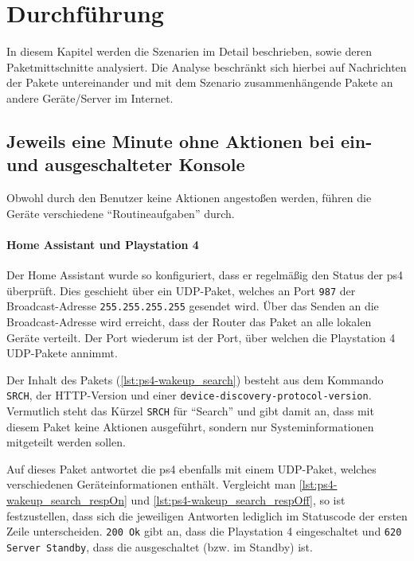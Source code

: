 \newpage
\section{Durchführung}\label{sec:durchfuehrung}
In diesem Kapitel werden die Szenarien im Detail beschrieben,
sowie deren Paketmittschnitte analysiert.
Die Analyse beschränkt sich hierbei auf Nachrichten der Pakete untereinander
und mit dem Szenario zusammenhängende Pakete an andere Geräte/Server im Internet.


\subsection{Jeweils eine Minute ohne Aktionen bei ein- und ausgeschalteter Konsole}\label{sec:durchfuehrung-aus}
Obwohl durch den Benutzer keine Aktionen angestoßen werden,
führen die Geräte verschiedene \enquote{Routineaufgaben} durch.

\paragraph{Home Assistant und Playstation 4}
Der Home Assistant wurde so konfiguriert,
dass er regelmäßig den Status der \ac{ps4} überprüft.
Dies geschieht über ein UDP-Paket,
welches an Port \texttt{987} der Broadcast-Adresse \texttt{255.255.255.255} gesendet wird.
Über das Senden an die Broadcast-Adresse wird erreicht,
dass der Router das Paket an alle lokalen Geräte verteilt.
Der Port wiederum ist der Port, über welchen die Playstation 4 UDP-Pakete annimmt.


Der Inhalt des Pakets (\autoref{lst:ps4-wakeup_search}) besteht aus dem Kommando \texttt{SRCH},
der HTTP-Version und einer \texttt{device-discovery-protocol-version}.
Vermutlich steht das Kürzel \texttt{SRCH} für \enquote{Search} und gibt damit an,
dass mit diesem Paket keine Aktionen ausgeführt,
sondern nur Systeminformationen mitgeteilt werden sollen.



Auf dieses Paket antwortet die \ac{ps4} ebenfalls mit einem UDP-Paket,
welches verschiedenen Geräteinformationen enthält.
Vergleicht man \autoref{lst:ps4-wakeup_search_respOn} und \autoref{lst:ps4-wakeup_search_respOff},
so ist festzustellen,
dass sich die jeweiligen Antworten lediglich im Statuscode der ersten Zeile unterscheiden.
\texttt{200 Ok} gibt an, dass die Playstation 4 eingeschaltet und \texttt{620 Server Standby},
dass die ausgeschaltet (bzw. im Standby) ist.

